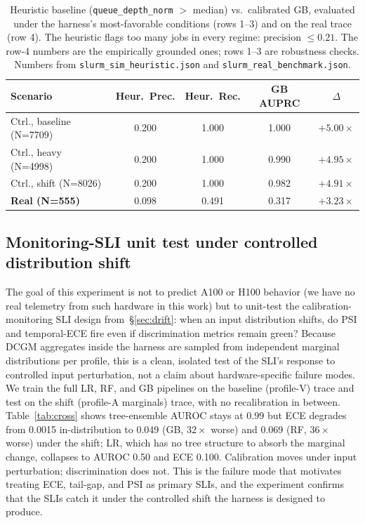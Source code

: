 \documentclass[conference]{IEEEtran}
\begin{document}
\begin{table}[!htbp]
\caption{Heuristic baseline (\texttt{queue\_depth\_norm} $>$ median) vs.\ calibrated GB, evaluated under the harness's most-favorable conditions (rows 1--3) and on the real trace (row 4). The heuristic flags too many jobs in every regime: precision $\leq 0.21$. The row-4 numbers are the empirically grounded ones; rows 1--3 are robustness checks. Numbers from \texttt{slurm\_sim\_heuristic.json} and \texttt{slurm\_real\_benchmark.json}.}
\label{tab:sim-heur}
\centering
\scriptsize
\setlength{\tabcolsep}{4pt}
\begin{tabular}{lcccc}
\toprule
Scenario & Heur.\ Prec. & Heur.\ Rec. & GB AUPRC & $\Delta$ \\
\midrule
Ctrl., baseline (N=7709) & 0.200 & 1.000 & 1.000 & $+5.00\times$ \\
Ctrl., heavy (N=4998)    & 0.200 & 1.000 & 0.990 & $+4.95\times$ \\
Ctrl., shift (N=8026)    & 0.200 & 1.000 & 0.982 & $+4.91\times$ \\
\textbf{Real (N=555)}    & 0.098 & 0.491 & 0.317 & $+3.23\times$ \\
\bottomrule
\end{tabular}
\end{table}

\subsection{Monitoring-SLI unit test under controlled distribution shift}
\label{sec:hwshift}
The goal of this experiment is not to predict A100 or H100 behavior (we have no real telemetry from such hardware in this work) but to unit-test the calibration-monitoring SLI design from~\S\ref{sec:drift}: when an input distribution shifts, do PSI and temporal-ECE fire even if discrimination metrics remain green? Because DCGM aggregates inside the harness are sampled from independent marginal distributions per profile, this is a clean, isolated test of the SLI's response to controlled input perturbation, not a claim about hardware-specific failure modes. We train the full LR, RF, and GB pipelines on the baseline (profile-V) trace and test on the shift (profile-A marginals) trace, with no recalibration in between. Table~\ref{tab:cross} shows tree-ensemble AUROC stays at 0.99 but ECE degrades from 0.0015 in-distribution to 0.049 (GB, $32\times$ worse) and 0.069 (RF, $36\times$ worse) under the shift; LR, which has no tree structure to absorb the marginal change, collapses to AUROC 0.50 and ECE 0.100. Calibration moves under input perturbation; discrimination does not. This is the failure mode that motivates treating ECE, tail-gap, and PSI as primary SLIs, and the experiment confirms that the SLIs catch it under the controlled shift the harness is designed to produce.
\end{document}
